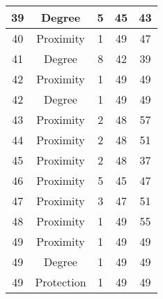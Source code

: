 \documentclass[results.tex]{subfiles}
\begin{document}
\begin{center}
\begin{tabular}{| c || c | c | c | c |}
            \hline
            39                      & Degree                       & 5                      & 45                      & 43                   \\
            \hline
            40                      & Proximity                    & 1                      & 49                      & 47                   \\
            \hline
            41                      & Degree                       & 8                      & 42                      & 39                   \\
            \hline
            42                      & Proximity                    & 1                      & 49                      & 49                   \\
            \hline
            42                      & Degree                       & 1                      & 49                      & 49                   \\
            \hline
            43                      & Proximity                    & 2                      & 48                      & 57                   \\
            \hline
            44                      & Proximity                    & 2                      & 48                      & 51                   \\
            \hline
            45                      & Proximity                    & 2                      & 48                      & 37                   \\
            \hline
            46                      & Proximity                    & 5                      & 45                      & 47                   \\
            \hline
            47                      & Proximity                    & 3                      & 47                      & 51                   \\
            \hline
            48                      & Proximity                    & 1                      & 49                      & 55                   \\
            \hline
            49                      & Proximity                    & 1                      & 49                      & 49                   \\
            \hline
            49                      & Degree                       & 1                      & 49                      & 49                   \\
            \hline
            49                      & Protection                   & 1                      & 49                      & 49                   \\
            \hline
        \end{tabular}
    \end{center}
\end{document}
